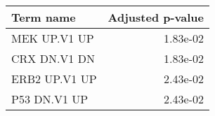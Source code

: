 \begin{tabular}{lr}
\toprule
     Term name &  Adjusted p-value \\
\midrule
  MEK UP.V1 UP &          1.83e-02 \\
  CRX DN.V1 DN &          1.83e-02 \\
 ERB2 UP.V1 UP &          2.43e-02 \\
  P53 DN.V1 UP &          2.43e-02 \\
\bottomrule
\end{tabular}

